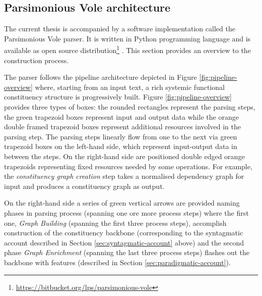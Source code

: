 \subsection{Parsimonious Vole architecture}
\label{sec:architecture}
The current thesis is accompanied by a software implementation called the Parsimonious Vole parser. It is written in Python programming language and is available as open source distribution\footnote{\url{https://bitbucket.org/lps/parsimonious-vole}} . This section provides an overview to the construction process.

The parser follows the pipeline architecture depicted in Figure \ref{fig:pipeline-overview} where, starting from an input text, a rich systemic functional constituency structure is progressively built. Figure \ref{fig:pipeline-overview} provides three types of boxes: the rounded rectangles represent the parsing steps, the green trapezoid boxes represent input and output data while the orange double framed trapezoid boxes represent additional resources involved in the parsing step. The parsing steps linearly flow from one to the next via green trapezoid boxes on the left-hand side, which represent input-output data in between the steps. On the right-hand side are positioned double edged orange trapezoids representing fixed resources needed by some operations. For example, the \textit{constituency graph creation} step takes a normalised dependency graph for input and produces a constituency graph as output.

On the right-hand side a series of green vertical arrows are provided naming phases in parsing process (spanning one ore more process steps) where the first one, \textit{Graph Building} (spanning the first three process steps), accomplish construction of the constituency backbone (corresponding to the syntagmatic account described in Section \ref{sec:syntagmatic-account} above) and the second phase \textit{Graph Enrichment} (spanning the last three process steps) flashes out the backbone with features (described in Section \ref{sec:paradigmatic-account}). 

